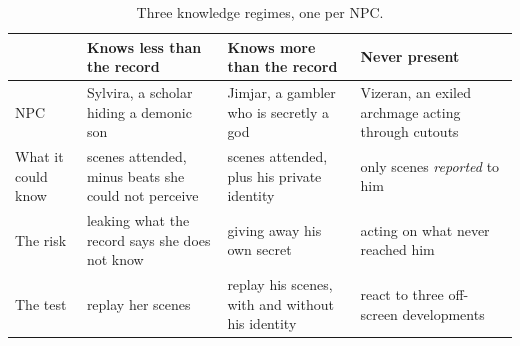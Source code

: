 \documentclass[11pt]{article}
\begin{document}
\begin{table}[t]
\centering
\small
\begin{tabularx}{\linewidth}{@{}lXXX@{}}
\toprule
& Knows less than the record & Knows more than the record & Never present \\
\midrule
NPC & Sylvira, a scholar hiding a demonic son & Jimjar, a gambler who is secretly a god & Vizeran, an exiled archmage acting through cutouts \\
What it could know & scenes attended, minus beats she could not perceive & scenes attended, plus his private identity & only scenes \emph{reported} to him \\
The risk & leaking what the record says she does not know & giving away his own secret & acting on what never reached him \\
The test & replay her scenes & replay his scenes, with and without his identity & react to three off-screen developments \\
\bottomrule
\end{tabularx}
\caption{Three knowledge regimes, one per NPC.}
\label{tab:regimes}
\end{table}
\end{document}
